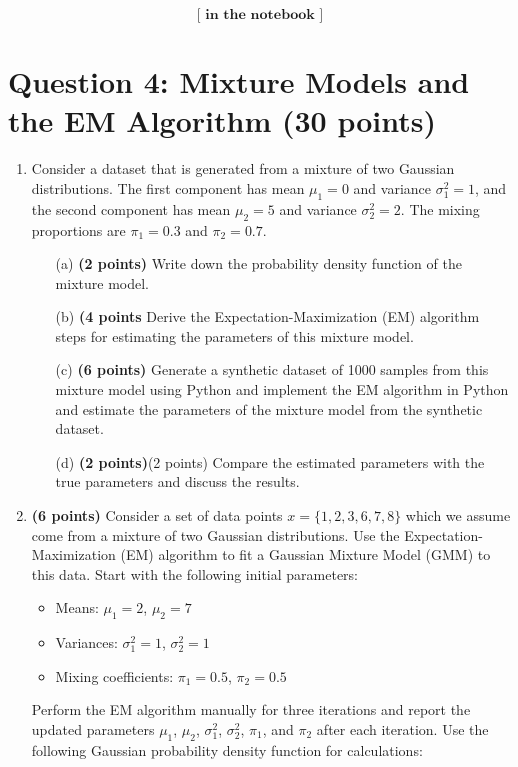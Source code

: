 \documentclass{article}
\begin{document}
\[
\textbf{[ in the notebook ]}
\]




\section*{Question 4: Mixture Models and the EM Algorithm (30 points)}

\begin{enumerate}
    \item Consider a dataset that is generated from a mixture of two Gaussian distributions. The first component has mean \(\mu_1 = 0\) and variance \(\sigma_1^2 = 1\), and the second component has mean \(\mu_2 = 5\) and variance \(\sigma_2^2 = 2\). The mixing proportions are \(\pi_1 = 0.3\) and \(\pi_2 = 0.7\).
    \begin{enumerate}
        \item[(a)] \textbf{(2 points)} Write down the probability density function of the mixture model.
        \item[(b)] \textbf{(4 points} Derive the Expectation-Maximization (EM) algorithm steps for estimating the parameters of this mixture model.
        \item[(c)] \textbf{(6 points)} Generate a synthetic dataset of 1000 samples from this mixture model using Python and implement the EM algorithm in Python and estimate the parameters of the mixture model from the synthetic dataset.
        \item[(d)] \textbf{(2 points)}(2 points) Compare the estimated parameters with the true parameters and discuss the results.
    \end{enumerate}
    
    \item \textbf{(6 points)} Consider a set of data points \(x = \{1, 2, 3, 6, 7, 8\}\) which we assume come from a mixture of two Gaussian distributions. Use the Expectation-Maximization (EM) algorithm to fit a Gaussian Mixture Model (GMM) to this data. Start with the following initial parameters:

    \begin{itemize}
        \item Means: \(\mu_1 = 2\), \(\mu_2 = 7\)
        \item Variances: \(\sigma_1^2 = 1\), \(\sigma_2^2 = 1\)
        \item Mixing coefficients: \(\pi_1 = 0.5\), \(\pi_2 = 0.5\)
    \end{itemize}

    Perform the EM algorithm manually for three iterations and report the updated parameters \(\mu_1\), \(\mu_2\), \(\sigma_1^2\), \(\sigma_2^2\), \(\pi_1\), and \(\pi_2\) after each iteration. Use the following Gaussian probability density function for calculations:
    

\end{enumerate}
\end{document}

